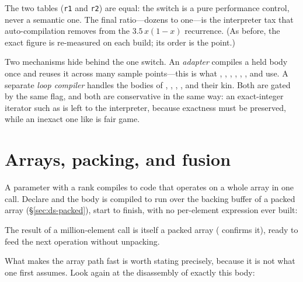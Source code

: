 \noindent The two tables (\texttt{r1} and \texttt{r2}) are equal: the switch is a
pure performance control, never a semantic one. The final ratio---dozens to
one---is the interpreter tax that auto-compilation removes from the
\(3.5\,x(1-x)\) recurrence. (As before, the exact figure is re-measured on each
build; its order is the point.)

Two mechanisms hide behind the one switch. An \emph{adapter} compiles a held body
once and reuses it across many sample points---this is what , ,
, , , ,  and  use.
A separate \emph{loop compiler} handles the bodies of , ,
, ,  and their kin. Both are gated by the same
 flag, and both are conservative in the same way: an
exact-integer  iterator such as  is left to the
interpreter, because exactness must be preserved, while an inexact one like
 is fair game.


\section{Arrays, packing, and fusion}
\label{sec:compile-arrays}

A parameter with a rank compiles to code that operates on a whole array in one
call. Declare  and the body is compiled to run over the
backing buffer of a packed array (\S\ref{sec:ds-packed}), start to finish, with no
per-element expression ever built:


\noindent The result of a million-element call is itself a packed array
( confirms it), ready to feed the next operation without unpacking.

What makes the array path fast is worth stating precisely, because it is not what
one first assumes. Look again at the disassembly of exactly this body:


